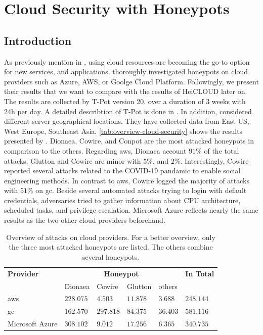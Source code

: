 \chapter{Cloud Security with Honeypots}

\section{Introduction}

As previously mention in , using cloud resources are becoming the go-to option for new services, and applications.
\citet{Kelly2021} thoroughly investigated honeypots on cloud providers such as Azure, AWS, or Goolge Cloud Platform.
Followingly, we present their results that we want to compare with the results of HeiCLOUD later on.
The results are collected by T-Pot version 20. over a duration of 3 weeks with 24h per day.
A detailed describtion of T-Pot is done in .
In addition, \citet{Kelly2021} considered different server geographical locations.
They have collected data from East US, West Europe, Southeast Asia.
\autoref{tab:overview-cloud-security} shows the results presented by \citet{Kelly2021}.
Dionaea, Cowire, and Conpot are the most attacked honeypots in comparison to the others.
Regarding \ac{aws}, Dionaea account $91\%$ of the total attacks, Glutton and Cowire are minor with $5\%$, and $2\%$.
Interestingly, Cowire reported several attacks related to the COVID-19 pandamic to enable social engineering methods.
In contrast to \ac{aws}, Cowire logged the majority of attacks with $51\%$ on \ac{gc}.
Beside several automated attacks trying to login with default credentials, adversaries tried to gather information about CPU architecture, scheduled tasks, and privilege escalation.
Microsoft Azure reflects nearly the same results as the two other cloud providers beforehand.

\begin{table}[h]
    \centering
    \caption[Overview of attacks on cloud providers]{Overview of attacks on cloud providers. For a better overview, only the three most attacked honeypots are listed. The others combine several honeypots.}
    \begin{tabular}{l|llll|l}
        \toprule
        \textbf{Provider} & \multicolumn{4}{c|}{\textbf{Honeypot}} & \textbf{In Total}                                   \\
                          & Dionaea                               & Cowire            & Glutton  & others   &           \\
        \hline
        \acl{aws}         & $228.075$                             & $4.503$           & $11.878$ & $3.688$  & $248.144$ \\
        \acl{gc}          & $162.570$                             & $297.818$         & $84.375$ & $36.403$ & $581.116$ \\
        Microsoft Azure   & $308.102$                             & $9.012$           & $17.256$ & $6.365$  & $340.735$ \\
        \bottomrule
    \end{tabular}
    \label{tab:overview-cloud-security}
\end{table}

